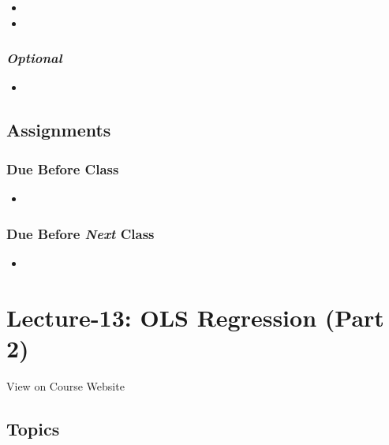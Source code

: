 \documentclass[]{book}
\theoremstyle{definition}
\theoremstyle{definition}
\theoremstyle{definition}
\theoremstyle{remark}
\begin{document}
\begin{itemize}
\item
\item
\end{itemize}

\subsubsection*{\texorpdfstring{\emph{Optional}}{Optional}}\label{optional-12}

\begin{itemize}
\item
\end{itemize}

\subsection*{Assignments}\label{assignments-13}

\subsubsection*{Due Before Class}\label{due-before-class-11}

\begin{itemize}
\item
\end{itemize}

\subsubsection*{\texorpdfstring{Due Before \emph{Next}
Class}{Due Before Next Class}}\label{due-before-next-class-12}

\begin{itemize}
\item
\end{itemize}

\section{Lecture-13: OLS Regression (Part
2)}\label{lecture-13-ols-regression-part-2}

View on Course Website

\subsection*{Topics}\label{topics-13}
\end{document}
